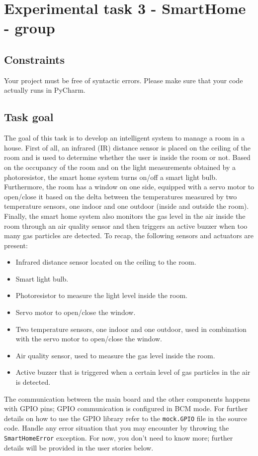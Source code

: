 \chapter{Experimental task 3 - SmartHome - \tdd group}
\section{Constraints}
Your project must be free of syntactic errors. Please make sure that your code actually runs in PyCharm.

\section{Task goal}
The goal of this task is to develop an intelligent system to manage a room in a house. First of all, an infrared (IR) distance sensor is placed on the ceiling of the room and is used to determine whether the user is inside the room or not.
Based on the occupancy of the room and on the light measurements obtained by a photoresistor, the smart home system turns on/off a smart light bulb. 
Furthermore, the room has a window on one side, equipped with a servo motor to open/close it based on the delta between the temperatures measured by two temperature sensors, one indoor and one outdoor (\ie inside and outside the room).
Finally, the smart home system also monitors the gas level in the air inside the room through an air quality sensor and then triggers an active buzzer when too many gas particles are detected.
To recap, the following sensors and actuators are present:

\begin{itemize}
    \item Infrared distance sensor located on the ceiling to the room.
    \item Smart light bulb.
    \item Photoresistor to measure the light level inside the room.
    \item Servo motor to open/close the window.
    \item Two temperature sensors, one indoor and one outdoor, used in combination with the servo motor to open/close the window.
    \item Air quality sensor, used to measure the gas level inside the room.
    \item Active buzzer that is triggered when a certain level of gas particles in the air is detected.
\end{itemize}

The communication between the main board and the other components happens with GPIO pins; GPIO communication is configured in BCM mode. For further details on how to use the GPIO library refer to the \texttt{mock.GPIO} file in the source code.
Handle any error situation that you may encounter by throwing the \texttt{SmartHomeError} exception.
For now, you don't need to know more; further details will be provided in the user stories below.


